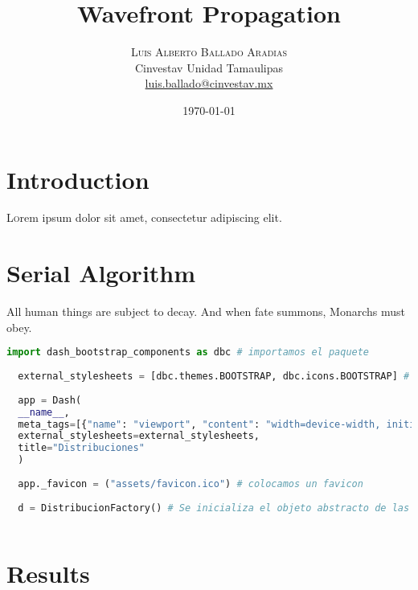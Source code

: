 \documentclass[oneside,twocolumn]{article}
\title{Wavefront Propagation} %
\author{%
\textsc{Luis Alberto Ballado Aradias} \\%
\normalsize Cinvestav Unidad Tamaulipas \\ %
\normalsize \href{mailto:luis.ballado@cinvestav.mx}{luis.ballado@cinvestav.mx} %
}
\date{\today} %
\begin{document}
\maketitle



    
\section{Introduction}

\lettrine[nindent=0em,lines=3]{L} orem ipsum dolor sit amet, consectetur adipiscing elit.
\blindtext %

\blindtext %


\newpage
\onecolumn
\section{Serial Algorithm}

All human things are subject to decay. And when fate summons, Monarchs must obey.
\begin{lstlisting}[language=Python, caption=Configuración Dash]
  import dash_bootstrap_components as dbc # importamos el paquete
  
  external_stylesheets = [dbc.themes.BOOTSTRAP, dbc.icons.BOOTSTRAP] # configuramos que tome los estilos de bootstrap asi como los iconos
  
  app = Dash(
  __name__,
  meta_tags=[{"name": "viewport", "content": "width=device-width, initial-scale=1"}],
  external_stylesheets=external_stylesheets,
  title="Distribuciones"
  )
  
  app._favicon = ("assets/favicon.ico") # colocamos un favicon
  
  d = DistribucionFactory() # Se inicializa el objeto abstracto de las distribuciones
  
\end{lstlisting}


\blindtext\blindtext


\twocolumn
\section{Results}
\end{document}
